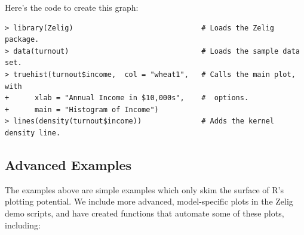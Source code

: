 \documentclass{article}
\begin{document}
Here's the code to create this graph:
\begin{verbatim}
> library(Zelig)                              # Loads the Zelig package.
> data(turnout)                               # Loads the sample data set.
> truehist(turnout$income,  col = "wheat1",   # Calls the main plot, with   
+      xlab = "Annual Income in $10,000s",    #  options.  
+      main = "Histogram of Income") 
> lines(density(turnout$income))              # Adds the kernel density line.  
\end{verbatim} %

\newpage

\subsection{Advanced Examples} 

The examples above are simple examples which only skim the surface of
R's plotting potential.  We include more advanced, model-specific
plots in the Zelig demo scripts, and have created functions that
automate some of these plots, including:  
\end{document}
